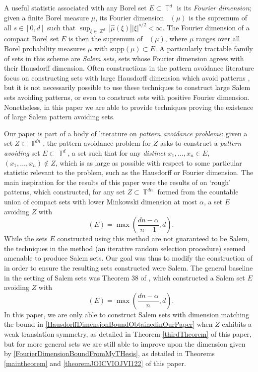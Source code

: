 \documentclass[dvipsnames,letterpaper,12pt]{article}
\numberwithin{equation}{section}
\DeclareMathOperator{\hausdim}{\dim_{\mathbb{H}}}
\DeclareMathOperator{\fordim}{\dim_{\mathbb{F}}}
\DeclareMathOperator{\ZZ}{\mathbb{Z}}
\DeclareMathOperator{\TT}{\mathbb{T}}
\numberwithin{theorem}{section}
\begin{document}

A useful statistic associated with any Borel set $E \subset \TT^d$ is its \emph{Fourier dimension}; given a finite Borel measure $\mu$, its Fourier dimension $\fordim(\mu)$ is the supremum of all $s \in [0,d]$ such that $\sup_{\xi \in \ZZ^d} |\widehat{\mu}(\xi)| |\xi|^{s/2} < \infty$. The Fourier dimension of a compact Borel set $E$ is then the supremum of $\fordim(\mu)$, where $\mu$ ranges over all Borel probability measures $\mu$ with $\text{supp}(\mu) \subset E$. A particularly tractable family of sets in this scheme are \emph{Salem sets}, sets whose Fourier dimension agrees with their Hausdorff dimension. Often constructions in the pattern avoidance literature focus on constructing sets with large Hausdorff dimension which avoid patterns \cite{OurPaper,PramanikFraser,Mathe}, but it is not necessarily possible to use these techniques to construct large Salem sets avoiding patterns, or even to construct sets with positive Fourier dimension. Nonetheless, in this paper we are able to provide techniques proving the existence of large Salem pattern avoiding sets.

Our paper is part of a body of literature on \emph{pattern avoidance problems}: given a set $Z \subset \TT^{dn}$, the pattern avoidance problem for $Z$ asks to construct a \emph{pattern avoiding} set $E \subset \TT^d$, a set such that for any \emph{distinct} $x_1,\dots,x_n \in E$, $(x_1,\dots,x_n) \not \in Z$, which is as large as possible with respect to some particular statistic relevant to the problem, such as the Hausdorff or Fourier dimension. The main inspiration for the results of this paper were the results of \cite{OurPaper} on `rough' patterns, which constructed, for any set $Z \subset \TT^{dn}$ formed from the countable union of compact sets with lower Minkowski dimension at most $\alpha$, a set $E$ avoiding $Z$ with
%
\begin{equation} \label{HausdorffDimensionBoundObtainedinOurPaper}
    \hausdim(E) = \max\left( \frac{dn - \alpha}{n - 1}, d \right).
\end{equation}
%
While the sets $E$ constructed using this method are not guaranteed to be Salem, the techniques in the method (an iterative random selection procedure) seemed amenable to produce Salem sets. Our goal was thus to modify the construction of \cite{OurPaper} in order to ensure the resulting sets constructed were Salem. The general baseline in the setting of Salem sets was Theorem 38 of \cite{MyThesis}, which constructed a Salem set $E$ avoiding $Z$ with
%
\begin{equation} \label{FourierDimensionBoundFromMyTHesis}
    \fordim(E) = \max \left( \frac{dn - \alpha}{n}, d \right).
\end{equation}
%
In this paper, we are only able to construct Salem sets with dimension matching the bound in \eqref{HausdorffDimensionBoundObtainedinOurPaper} when $Z$ exhibits a weak translation symmetry, as detailed in Theorem \ref{thirdTheorem} of this paper, but for more general sets we are still able to improve upon the dimension given by \eqref{FourierDimensionBoundFromMyTHesis}, as detailed in Theorems \ref{maintheorem} and \ref{theoremJOICVIOJVI122} of this paper.
\end{document}
